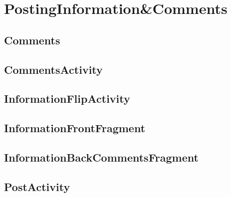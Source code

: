 \section{PostingInformation\&Comments}

\subsection{Comments}



\subsection{CommentsActivity}



\subsection{InformationFlipActivity}



\subsection{InformationFrontFragment}



\subsection{InformationBackCommentsFragment}



\subsection{PostActivity}

